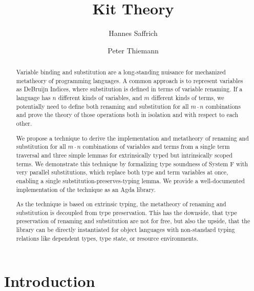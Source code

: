 \documentclass[sigplan,10pt]{acmart}
\title{Kit Theory}
\author{Hannes Saffrich}
\affiliation{
  \institution{University of Freiburg}      %
  \country{Germany}                         %
}
\author{Peter Thiemann}
\affiliation{
  \institution{University of Freiburg}      %
  \country{Germany}                         %
}
\begin{document}
  \begin{abstract}
    Variable binding and substitution are a long-standing nuisance for mechanized
    metatheory of programming languages. A common approach is to represent
    variables as DeBruijn Indices, where substitution is defined in terms of
    variable renaming. If a language has $n$ different kinds of variables, and
    $m$ different kinds of terms, we potentially need to define both
    renaming and substitution for all $m\cdot n$ combinations and prove the
    theory of those operations both in isolation and with respect to each other.


    We propose a technique to derive the implementation and metatheory of
    renaming and substitution for all $m\cdot n$ combinations of variables and terms
    from a single term traversal and three simple lemmas for extrinsically typed
    but intrinsically scoped terms.
    We demonstrate this technique by formalizing type soundness of System F with
    very parallel substitutions, which replace both type and term variables at
    once, enabling a single substitution-preserves-typing lemma.
    We provide a well-documented implementation of the technique as an Agda
    library.

    As the technique is based on extrinsic typing, the metatheory of renaming
    and substitution is decoupled from type preservation.
    This has the downside, that type preservation of renaming and substitution
    are not for free, but also the upside, that the library can be directly
    instantiated for object languages with non-standard typing relations like
    dependent types, type state, or resource environments.
  \end{abstract}

  \maketitle



  \section{Introduction}
  \newpage
\end{document}
